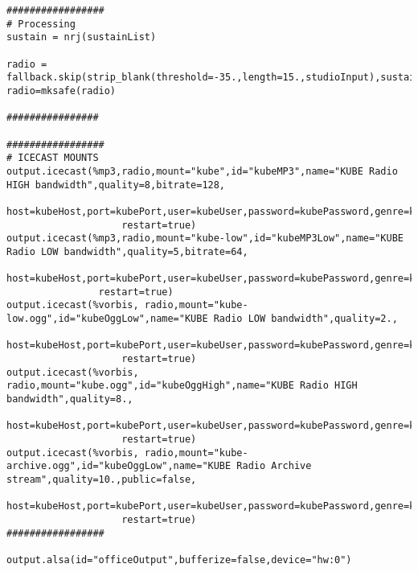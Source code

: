 \begin{verbatim}
#################
# Processing
sustain = nrj(sustainList)

radio = fallback.skip(strip_blank(threshold=-35.,length=15.,studioInput),sustain)
radio=mksafe(radio)

################

#################
# ICECAST MOUNTS
output.icecast(%mp3,radio,mount="kube",id="kubeMP3",name="KUBE Radio HIGH bandwidth",quality=8,bitrate=128,
                    host=kubeHost,port=kubePort,user=kubeUser,password=kubePassword,genre=kubeGenre,url=kubeUrl,description=kubeDesc,
                    restart=true)
output.icecast(%mp3,radio,mount="kube-low",id="kubeMP3Low",name="KUBE Radio LOW bandwidth",quality=5,bitrate=64,
                host=kubeHost,port=kubePort,user=kubeUser,password=kubePassword,genre=kubeGenre,url=kubeUrl,description=kubeDesc,
                restart=true)
output.icecast(%vorbis, radio,mount="kube-low.ogg",id="kubeOggLow",name="KUBE Radio LOW bandwidth",quality=2.,
                    host=kubeHost,port=kubePort,user=kubeUser,password=kubePassword,genre=kubeGenre,url=kubeUrl,description=kubeDesc,
                    restart=true)
output.icecast(%vorbis, radio,mount="kube.ogg",id="kubeOggHigh",name="KUBE Radio HIGH bandwidth",quality=8.,
                    host=kubeHost,port=kubePort,user=kubeUser,password=kubePassword,genre=kubeGenre,url=kubeUrl,description=kubeDesc,
                    restart=true)
output.icecast(%vorbis, radio,mount="kube-archive.ogg",id="kubeOggLow",name="KUBE Radio Archive stream",quality=10.,public=false,
                    host=kubeHost,port=kubePort,user=kubeUser,password=kubePassword,genre=kubeGenre,url=kubeUrl,description=kubeDesc,
                    restart=true)
#################

output.alsa(id="officeOutput",bufferize=false,device="hw:0")
\end{verbatim}
